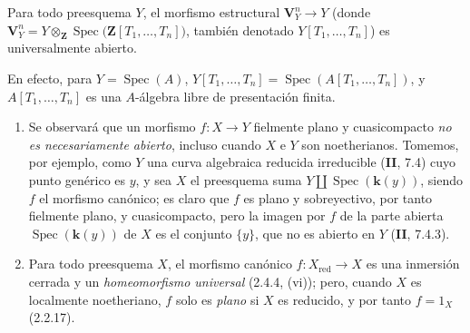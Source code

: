 \begin{corollary}[2.4.7]
\label{IV.2.4.7-fr}
Para todo preesquema $Y$, el morfismo estructural $\mathbf V_Y^n\to Y$ \textup{(donde}
$\mathbf V_Y^n
=Y\otimes_{\mathbf Z}\operatorname{Spec}
  \bigl(\mathbf Z[T_1,\ldots,T_n]\bigr)$,
\textup{también denotado $Y[T_1,\ldots,T_n]$)} es universalmente abierto.
\end{corollary}

En efecto, para $Y=\operatorname{Spec}(A)$,
$Y[T_1,\ldots,T_n]=\operatorname{Spec}(A[T_1,\ldots,T_n])$, y
$A[T_1,\ldots,T_n]$ es una $A$-álgebra libre de presentación finita.

\begin{remarks}[2.4.8]
\label{IV.2.4.8-fr}
\begin{enumerate}
\item[(i)] Se observará que un morfismo $f:X\to Y$ fielmente plano y
cuasicompacto \emph{no es necesariamente abierto}, incluso cuando $X$ e $Y$
son noetherianos. Tomemos, por ejemplo, como $Y$ una curva algebraica reducida
irreducible (\textbf{II}, 7.4) cuyo punto genérico es $y$, y sea $X$ el preesquema suma
$Y\amalg\operatorname{Spec}(\boldsymbol{k}(y))$, siendo $f$ el morfismo canónico; es claro
que $f$ es plano y sobreyectivo, por tanto fielmente plano, y cuasicompacto,
pero la imagen por $f$ de la parte abierta $\operatorname{Spec}(\boldsymbol{k}(y))$ de $X$
es el conjunto $\{y\}$, que no es abierto en $Y$ (\textbf{II}, 7.4.3).
\item[(ii)] Para todo preesquema $X$, el morfismo canónico
$f:X_{\mathrm{red}}\to X$ es una inmersión cerrada y un
\emph{homeomorfismo universal} (2.4.4, (vi)); pero, cuando $X$ es localmente
noetheriano, $f$ solo es \emph{plano} si $X$ es reducido, y por tanto
$f=1_X$ (2.2.17).
\end{enumerate}
\end{remarks}
